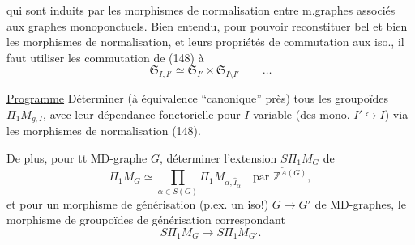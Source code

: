 qui sont induits par les morphismes de normalisation entre m.graphes associés aux graphes monoponctuels. Bien entendu, pour pouvoir reconstituer bel et bien les  morphismes de normalisation, et leurs propriétés de commutation aux iso., il faut utiliser les  commutation de (148) à
\[
\mathfrak S_{I,I'}\simeq\mathfrak S_{I'}\times\mathfrak S_{I\setminus I'}\qquad\ldots
\]

\uline{Programme} Déterminer (à équivalence ``canonique'' près) tous les groupoïdes $\Pi_1M_{g,I}$, avec leur dépendance fonctorielle pour  $I$ variable (des mono. $I'\hookrightarrow I$) via les morphismes de normalisation (148).

De plus, pour tt MD-graphe $G$, déterminer l'extension $S\Pi_1M_G$ de
\[
\Pi_1M_G\simeq\prod_{\alpha\in S(G)}\Pi_1M_{\alpha,\widehat I_\alpha}\quad\text{par }\mathbb Z^{\widetilde A(G)},
\]
et pour un morphisme de générisation (p.ex. un iso!)  $G\longrightarrow G'$ de MD-graphes,  le morphisme de groupoïdes de générisation correspondant
\[
S\Pi_1M_G\longrightarrow S\Pi_1M_{G'}.
\]
